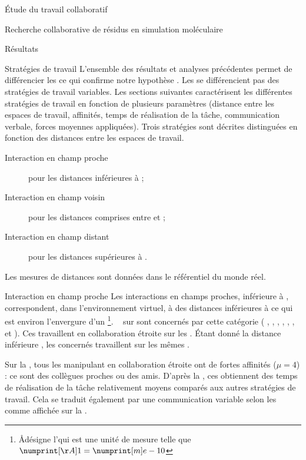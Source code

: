 \documentclass[myfrancais]{mythesis}
\begin{document}
\begin{mypart}{Étude du travail collaboratif}
\begin{mychapter}{Recherche collaborative de résidus en simulation moléculaire}
\begin{mysection}{Résultats}
\begin{mysubsection}{Stratégies de travail}
					L'ensemble des résultats et analyses précédentes permet de différencier les  ce qui confirme notre hypothèse .
					Les  se différencient pas des stratégies de travail variables.
					Les sections suivantes caractérisent les différentes stratégies de travail en fonction de plusieurs paramètres (distance entre les espaces de travail, affinités, temps de réalisation de la tâche, communication verbale, forces moyennes appliquées).
					Trois stratégies sont décrites distinguées en fonction des distances entre les espaces de travail.
					\begin{description}
						\item[Interaction en champ proche] pour les distances inférieures à ;
						\item[Interaction en champ voisin] pour les distances comprises entre  et ;
						\item[Interaction en champ distant] pour les distances supérieures à .
					\end{description}
					Les mesures de distances sont données dans le référentiel du monde réel.
					\begin{mysubsubsection}{Interaction en champ proche}
						Les interactions en champs proches, inférieure à , correspondent, dans l'environnement virtuel, à des distances inférieures à  ce qui est environ l'envergure d'un \footnote{\og \AA \fg désigne l'\myangstrom qui est une unité de mesure telle que $\mynum[\AA]{1} = \mynum[m]{e-10}$}.
						~ sur  sont concernés par cette catégorie ( , , , , , ,  et ).
						Ces  travaillent en collaboration étroite sur les .
						Étant donné la distance inférieure , les  concernés travaillent sur les mêmes .

						Sur la , tous les  manipulant en collaboration étroite ont de fortes affinités ($\mu = 4$) : ce sont des collègues proches ou des amis.
						D'après la , ces  obtiennent des temps de réalisation de la tâche relativement moyens comparés aux autres stratégies de travail.
						Cela se traduit également par une communication variable selon les  comme affichée sur la .


\end{mysubsubsection}
\end{mysubsection}
\end{mysection}
\end{mychapter}
\end{mypart}
\end{document}
